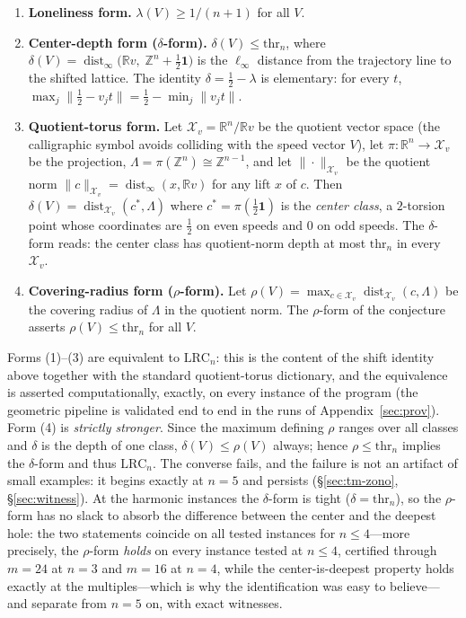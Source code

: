 \documentclass[11pt,a4paper]{article}
\numberwithin{equation}{section}
\theoremstyle{plain}
\theoremstyle{definition}
\theoremstyle{remark}
\newcommand{\Z}{\mathbb{Z}}
\newcommand{\R}{\mathbb{R}}
\newcommand{\wnc}[1]{\lVert #1 \rVert}
\newcommand{\lrc}{\mathrm{LRC}}
\begin{document}
\begin{enumerate}[leftmargin=1.6em,itemsep=2pt]
\item \textbf{Loneliness form.} $\lambda(V)\ge 1/(n+1)$ for all $V$.
\item \textbf{Center-depth form ($\delta$-form).}
$\delta(V)\le \mathrm{thr}_n$, where
$\delta(V)=\operatorname{dist}_\infty\!\bigl(\R v,\;\Z^n+\tfrac12\mathbf{1}\bigr)$
is the $\ell_\infty$ distance from the trajectory line to the shifted
lattice. The identity
$\delta=\tfrac12-\lambda$ is elementary: for every $t$,
$\max_j \wnc{\tfrac12-v_jt}=\tfrac12-\min_j\wnc{v_jt}$.
\item \textbf{Quotient-torus form.} Let $\mathcal{X}_v=\R^n/\R v$ be
the quotient vector space (the calligraphic symbol avoids colliding with
the speed vector $V$), let $\pi\colon\R^n\to\mathcal{X}_v$ be the
projection, $\Lambda=\pi(\Z^n)\cong\Z^{n-1}$, and let
$\|\cdot\|_{\mathcal{X}_v}$ be the quotient norm
$\|c\|_{\mathcal{X}_v}=\operatorname{dist}_\infty(x,\R v)$ for any lift
$x$ of $c$. Then $\delta(V)=\operatorname{dist}_{\mathcal{X}_v}(c^*,\Lambda)$
where $c^*=\pi(\tfrac12\mathbf{1})$ is the \emph{center class}, a
$2$-torsion point whose coordinates are $\tfrac12$ on even speeds and $0$
on odd speeds. The $\delta$-form reads: the center class has quotient-norm
depth at most $\mathrm{thr}_n$ in every $\mathcal{X}_v$.
\item \textbf{Covering-radius form ($\rho$-form).}
Let $\rho(V)=\max_{c\in\mathcal{X}_v}\operatorname{dist}_{\mathcal{X}_v}(c,
\Lambda)$ be the covering radius of $\Lambda$ in the quotient norm. The
$\rho$-form of the conjecture asserts $\rho(V)\le\mathrm{thr}_n$ for all
$V$.
\end{enumerate}

Forms (1)--(3) are equivalent to $\lrc_n$: this is the content of the
shift identity above together with the standard quotient-torus dictionary,
and the equivalence is asserted computationally, exactly, on every
instance of the program (the geometric pipeline is validated end to end
in the runs of Appendix~\ref{sec:prov}). Form (4) is \emph{strictly
stronger}. Since the maximum defining $\rho$ ranges over all classes and
$\delta$ is the depth of one class, $\delta(V)\le\rho(V)$ always; hence
$\rho\le\mathrm{thr}_n$ implies the $\delta$-form and thus $\lrc_n$. The
converse fails, and the failure is not an artifact of small examples: it
begins exactly at $n=5$ and persists (\S\ref{sec:tm-zono},
\S\ref{sec:witness}). At the harmonic instances the $\delta$-form is
tight ($\delta=\mathrm{thr}_n$), so the $\rho$-form has no slack to
absorb the difference between the center and the deepest hole: the
two statements coincide on all tested instances for $n\le 4$---more
precisely, the $\rho$-form \emph{holds} on every instance tested at
$n\le 4$, certified through $m=24$ at $n=3$ and $m=16$ at $n=4$, while
the center-is-deepest property holds exactly at the multiples---which is
why the identification was easy to believe---and separate from $n=5$ on,
with exact witnesses.
\end{document}
